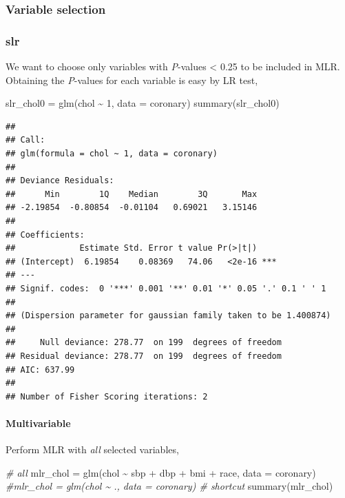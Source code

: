 \documentclass[
]{book}
\makeatletter
\newenvironment{Shaded}{\begin{snugshade}}{\end{snugshade}}
\newcommand{\AttributeTok}[1]{\textcolor[rgb]{0.61,0.61,0.61}{#1}}
\newcommand{\CommentTok}[1]{\textcolor[rgb]{0.37,0.37,0.37}{\textit{#1}}}
\newcommand{\DecValTok}[1]{\textcolor[rgb]{0.06,0.06,0.06}{#1}}
\newcommand{\FunctionTok}[1]{\textcolor[rgb]{0,0,0}{#1}}
\newcommand{\NormalTok}[1]{#1}
\newcommand{\OtherTok}[1]{\textcolor[rgb]{0.37,0.37,0.37}{#1}}
\newcommand{\SpecialCharTok}[1]{\textcolor[rgb]{0,0,0}{#1}}
\newenvironment{kframe}{%
\medskip{}
\setlength{\fboxsep}{.8em}
 \def\at@end@of@kframe{}%
 \ifinner\ifhmode%
  \def\at@end@of@kframe{\end{minipage}}%
  \begin{minipage}{\columnwidth}%
 \fi\fi%
 \def\FrameCommand##1{\hskip\@totalleftmargin \hskip-\fboxsep
 \colorbox{shadecolor}{##1}\hskip-\fboxsep
     \hskip-\linewidth \hskip-\@totalleftmargin \hskip\columnwidth}%
 \MakeFramed {\advance\hsize-\width
   \@totalleftmargin\z@ \linewidth\hsize
   \@setminipage}}%
 {\par\unskip\endMakeFramed%
 \at@end@of@kframe}
\renewenvironment{Shaded}{\begin{kframe}}{\end{kframe}}
\makeatother
\begin{document}
\hypertarget{variable-selection}{%
\subsubsection{Variable selection}\label{variable-selection}}

\hypertarget{slr}{%
\subsubsection{slr}\label{slr}}

We want to choose only variables with \emph{P}-values \textless{} 0.25 to be included in MLR. Obtaining the \emph{P}-values for each variable is easy by LR test,

\begin{Shaded}
\begin{Highlighting}[]
\NormalTok{slr\_chol0 }\OtherTok{=} \FunctionTok{glm}\NormalTok{(chol }\SpecialCharTok{\textasciitilde{}} \DecValTok{1}\NormalTok{, }\AttributeTok{data =}\NormalTok{ coronary)}
\FunctionTok{summary}\NormalTok{(slr\_chol0)}
\end{Highlighting}
\end{Shaded}

\begin{verbatim}
## 
## Call:
## glm(formula = chol ~ 1, data = coronary)
## 
## Deviance Residuals: 
##      Min        1Q    Median        3Q       Max  
## -2.19854  -0.80854  -0.01104   0.69021   3.15146  
## 
## Coefficients:
##             Estimate Std. Error t value Pr(>|t|)    
## (Intercept)  6.19854    0.08369   74.06   <2e-16 ***
## ---
## Signif. codes:  0 '***' 0.001 '**' 0.01 '*' 0.05 '.' 0.1 ' ' 1
## 
## (Dispersion parameter for gaussian family taken to be 1.400874)
## 
##     Null deviance: 278.77  on 199  degrees of freedom
## Residual deviance: 278.77  on 199  degrees of freedom
## AIC: 637.99
## 
## Number of Fisher Scoring iterations: 2
\end{verbatim}

\hypertarget{multivariable}{%
\paragraph{Multivariable}\label{multivariable}}

Perform MLR with \emph{all} selected variables,

\begin{Shaded}
\begin{Highlighting}[]
\CommentTok{\# all}
\NormalTok{mlr\_chol }\OtherTok{=} \FunctionTok{glm}\NormalTok{(chol }\SpecialCharTok{\textasciitilde{}}\NormalTok{ sbp }\SpecialCharTok{+}\NormalTok{ dbp }\SpecialCharTok{+}\NormalTok{ bmi }\SpecialCharTok{+}\NormalTok{ race, }\AttributeTok{data =}\NormalTok{ coronary)}
\CommentTok{\#mlr\_chol = glm(chol \textasciitilde{} ., data = coronary)  \# shortcut}
\FunctionTok{summary}\NormalTok{(mlr\_chol)}
\end{Highlighting}
\end{Shaded}
\end{document}
